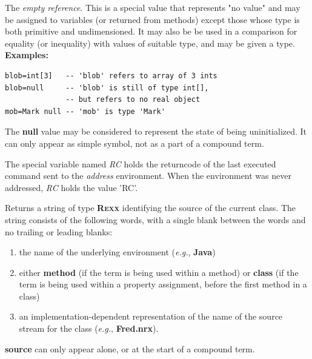 \begin{description}
The \emph{empty reference}.  This is a special value that represents
"no value" and may be assigned to variables (or returned from
methods) except those whose type is both primitive and undimensioned.
It may also be be used in a comparison for equality (or inequality) with
values of suitable type, and may be given a type.
 \textbf{Examples:}
\begin{lstlisting}
blob=int[3]   -- 'blob' refers to array of 3 ints
blob=null     -- 'blob' is still of type int[],
              -- but refers to no real object
mob=Mark null -- 'mob' is type 'Mark'
\end{lstlisting}
 The \textbf{null} value may be considered to represent the state of
being uninitialized.  It can only appear as simple symbol, not as a part
of a compound term.

\item[RC]\label{refswrc}
 
The special variable named \emph{RC} holds the returncode of the last executed command sent
to the \emph{address} environment.
When the environment was never addressed, \emph{RC} holds the value 'RC'. 
\item[source]\label{refswsourc}
 
Returns a string of type \textbf{R\textsc{exx}} identifying the source of the
current class.
The string consists of the following words, with a single blank between
the words and no trailing or leading blanks:
\begin{enumerate}
\item the name of the underlying environment (\emph{e.g.}, \textbf{Java})
\item either \textbf{method} (if the term is being used within a method)
or \textbf{class} (if the term is being used within a property
assignment, before the first method in a class)
\item 
an implementation-dependent representation of the name of the
source stream for the class (\emph{e.g.}, \textbf{Fred.nrx}).
\end{enumerate}
 \textbf{source} can only appear alone, or at the start of a
compound term.
\item[sourceline]\label{refswsourl}
 

\end{description}
